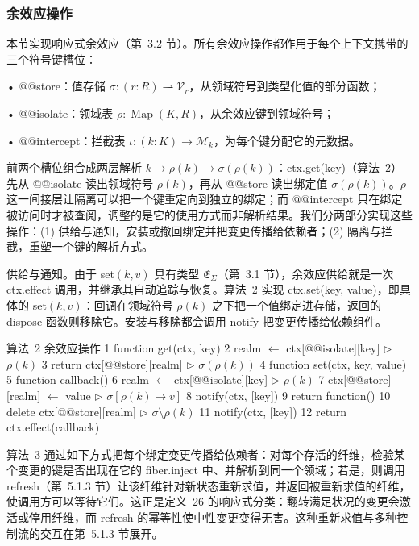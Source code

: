 \documentclass[
  10
]{article}
\begin{document}
\subsubsection{余效应操作} \label{coefect-operations}

本节实现响应式余效应（第~3.2 节）。所有余效应操作都作用于每个上下文携带的三个符号键槽位：

• @@store：值存储 \(\sigma : ( r : R ) \rightharpoonup \mathcal { V } _ { r }\)，从领域符号到类型化值的部分函数；

• @@isolate：领域表 \(\rho : \operatorname { M a p } ( K , R )\)，从余效应键到领域符号；

• @@intercept：拦截表 \(\iota : ( k : K ) \to \mathcal { M } _ { k }\)，为每个键分配它的元数据。

前两个槽位组合成两层解析 \(k \to \rho ( k ) \to \sigma ( \rho ( k ) )\)：ctx.get(key)（算法~2）先从 @@isolate 读出领域符号 \(\rho ( k )\)，再从 @@store 读出绑定值 \(\sigma ( \rho ( k ) )\)。\(\rho\) 这一间接层让隔离可以把一个键重定向到独立的绑定；而 @@intercept 只在绑定被访问时才被查阅，调整的是它的使用方式而非解析结果。我们分两部分实现这些操作：(1) 供给与通知，安装或撤回绑定并把变更传播给依赖者；(2) 隔离与拦截，重塑一个键的解析方式。

供给与通知。由于 set\(( k , v )\) 具有类型 \(\mathfrak { E } _ { \Sigma }\)（第~3.1 节），余效应供给就是一次 ctx.effect 调用，并继承其自动追踪与恢复。算法~2 实现 ctx.set(key, value)，即具体的 set\(( k , v )\)：回调在领域符号 \(\rho ( k )\) 之下把一个值绑定进存储，返回的 dispose 函数则移除它。安装与移除都会调用 notify 把变更传播给依赖组件。

算法~2 余效应操作
1 function get(ctx, key)
2 realm $\leftarrow$ ctx{[}@@isolate{]}{[}key{]} $\triangleright$ $\rho ( k )$
3 return ctx{[}@@store{]}{[}realm{]} $\triangleright$ $\sigma ( \rho ( k ) )$
4 function set(ctx, key, value)
5 function callback()
6 realm $\leftarrow$ ctx{[}@@isolate{]}{[}key{]} $\triangleright$ $\rho ( k )$
7 ctx{[}@@store{]}{[}realm{]} $\leftarrow$ value $\triangleright$ $\sigma [ \rho ( k ) \mapsto v ]$
8 notify(ctx, {[}key{]})
9 return function()
10 delete ctx{[}@@store{]}{[}realm{]} $\triangleright$ $\sigma \setminus \rho ( k )$
11 notify(ctx, {[}key{]})
12 return ctx.effect(callback)

算法~3 通过如下方式把每个绑定变更传播给依赖者：对每个存活的纤维，检验某个变更的键是否出现在它的 fiber.inject 中、并解析到同一个领域；若是，则调用 refresh（第~5.1.3 节）让该纤维针对新状态重新求值，并返回被重新求值的纤维，使调用方可以等待它们。这正是定义~26 的响应式分类：翻转满足状况的变更会激活或停用纤维，而 refresh 的幂等性使中性变更变得无害。这种重新求值与多种控制流的交互在第~5.1.3 节展开。
\end{document}
